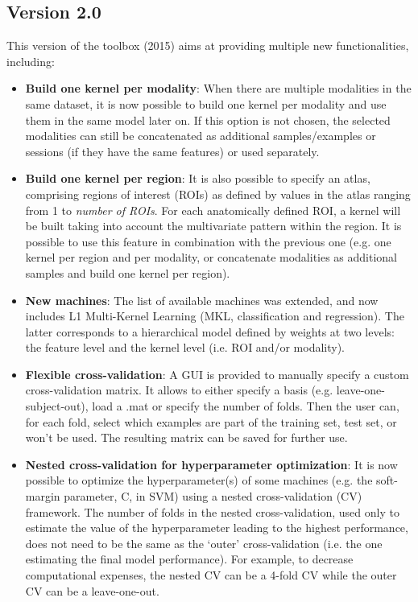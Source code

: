 \subsection{Version 2.0}
This version of the toolbox (2015) aims at providing multiple new functionalities, including:
\begin{itemize}
\item \textbf{Build one kernel per modality}: When there are multiple modalities in the same dataset, it is now possible to build one kernel per modality and use them in the same model later on. If this option is not chosen, the selected modalities can still be concatenated as additional samples/examples or sessions (if they have the same features) or used separately.
\item \textbf{Build one kernel per region}: It is also possible to specify an atlas, comprising regions of interest (ROIs) as defined by values in the atlas ranging from 1 to \textit{number of ROIs}. For each anatomically defined ROI, a kernel will be built taking into account the multivariate pattern within the region. It is possible to use this feature in combination with the previous one (e.g. one kernel per region and per modality, or concatenate modalities as additional samples and build one kernel per region).
\item \textbf{New machines}: The list of available machines was extended, and now includes L1 Multi-Kernel Learning (MKL, classification and regression). The latter corresponds to a hierarchical model defined by weights at two levels: the feature level and the kernel level (i.e. ROI and/or modality).
\item \textbf{Flexible cross-validation}: A GUI is provided to manually specify a custom cross-validation matrix. It allows to either specify a basis (e.g. leave-one-subject-out), load a .mat or specify the number of folds. Then the user can, for each fold, select which examples are part of the training set, test set, or won't be used. The resulting matrix can be saved for further use.
\item \textbf{Nested cross-validation for hyperparameter optimization}: It is now possible to optimize the hyperparameter(s) of some machines (e.g. the soft-margin parameter, C, in SVM) using a nested cross-validation (CV) framework. The number of folds in the nested cross-validation, used only to estimate the value of the hyperparameter leading to the highest performance, does not need to be the same as the `outer' cross-validation (i.e. the one estimating the final model performance). For example, to decrease computational expenses, the nested CV can be a 4-fold CV while the outer CV can be a leave-one-out.

\end{itemize}
